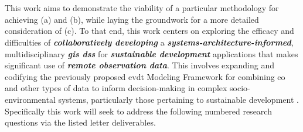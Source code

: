 \section{}

This work aims to demonstrate the viability of a particular methodology for achieving (a) and (b), while laying the groundwork for a more detailed consideration of (c). To that end, this work centers on exploring the efficacy and difficulties of \textbf{\textit{collaboratively developing}} a \textbf{\textit{systems-architecture-informed}}, multidisciplinary \textbf{\textit{\ac{gis} \ac{dss}}} for \textbf{\textit{sustainable development}} applications that makes significant use of \textbf{\textit{remote observation data}}. This involves expanding and codifying the previously proposed \ac{evdt} Modeling Framework  for combining \ac{eo} and other types of data to inform decision-making in complex socio-environmental systems, particularly those pertaining to sustainable development \cite{reidCombiningSocialEnvironmental2019}. Specifically this work will seek to address the following numbered research questions via the listed letter deliverables.

